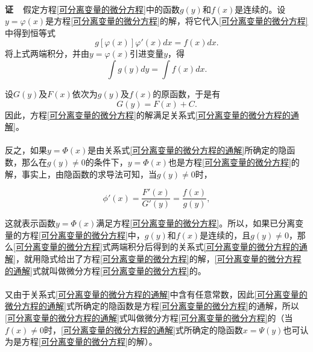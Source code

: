 \paragraph{}
\textbf{证~~}假定方程\eqref{可分离变量的微分方程}中的函数$g(y)$和$f(x)$是连续的。设$y=\varphi(x)$是方程\eqref{可分离变量的微分方程}的解，将它代入\eqref{可分离变量的微分方程}中得到恒等式
\begin{equation}
  g[\varphi(x)]\varphi'(x)dx = f(x)dx.
\end{equation}
将上式两端积分，并由$y=\varphi(x)$引进变量$y$，得
\begin{equation}
  \int{g(y)dy} = \int{f(x)dx}.
\end{equation}

设$G(y)$及$F(x)$依次为$g(y)$及$f(x)$的原函数，于是有
\begin{equation}
  \label{可分离变量的微分方程的通解}
  G(y) = F(x) + C.
\end{equation}
因此，方程\eqref{可分离变量的微分方程}的解满足关系式\eqref{可分离变量的微分方程的通解}。

\paragraph{}
反之，如果$y=\Phi(x)$是由关系式\eqref{可分离变量的微分方程的通解}所确定的隐函数，那么在$g(y) \neq 0$的条件下，$y=\Phi(x)$也是方程\eqref{可分离变量的微分方程}的解，事实上，由隐函数的求导法可知，当$g(y) \neq 0$时，

\begin{equation}
  \phi'(x) = \frac{F'(x)}{G'(y)} = \frac{f(x)}{g(y)},
\end{equation}

这就表示函数$y=\Phi(x)$满足方程\eqref{可分离变量的微分方程}。所以，如果已分离变量的方程\eqref{可分离变量的微分方程}中，$g(y)$和$f(x)$是连续的，且$g(y) \neq 0$，那么\eqref{可分离变量的微分方程}式两端积分后得到的关系式\eqref{可分离变量的微分方程的通解}，就用隐式给出了方程\eqref{可分离变量的微分方程}的解，\eqref{可分离变量的微分方程的通解}式就叫做微分方程\eqref{可分离变量的微分方程}的。

\paragraph{}
又由于关系式\eqref{可分离变量的微分方程的通解}中含有任意常数，因此\eqref{可分离变量的微分方程的通解}式所确定的隐函数是方程\eqref{可分离变量的微分方程}的通解，所以\eqref{可分离变量的微分方程的通解}式叫做微分方程\eqref{可分离变量的微分方程}的（当$f(x)\neq0$时，\eqref{可分离变量的微分方程的通解}式所确定的隐函数$x=\Psi(y)$也可认为是方程\eqref{可分离变量的微分方程}的解）。
